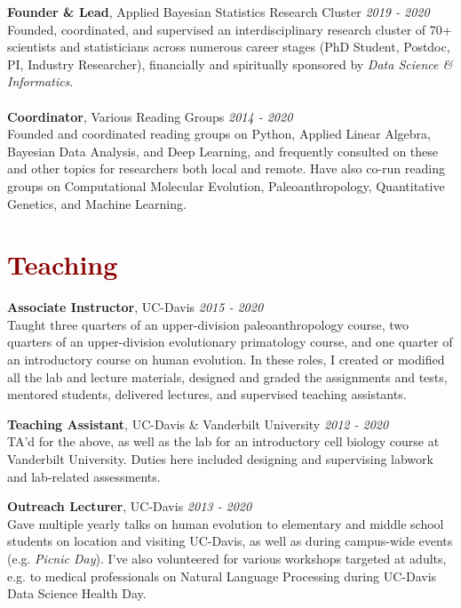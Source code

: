\documentclass[11pt,margin,line]{resume}
\begin{document}
\begin{resume}
\textbf{Founder \& Lead}, Applied Bayesian Statistics Research Cluster \hfill \emph{2019 - 2020}\\
Founded, coordinated, and supervised an interdisciplinary research cluster of 70+ scientists and statisticians across numerous career stages (PhD Student, Postdoc, PI, Industry Researcher), financially and spiritually sponsored by \emph{Data Science \& Informatics}.\vspace{-1.5mm}\\\\
\textbf{Coordinator}, Various Reading Groups \hfill \emph{2014 - 2020}\\
Founded and coordinated reading groups on Python, Applied Linear Algebra, Bayesian Data Analysis, and Deep Learning, and frequently consulted on these and other topics for researchers both local and remote. Have also co-run reading groups on Computational Molecular Evolution, Paleoanthropology, Quantitative Genetics, and Machine Learning.
\vspace{-1.5mm}

\section{\large\textcolor{DarkRed}{Teaching}}

\textbf{Associate Instructor}, UC-Davis \hfill \emph{2015  - 2020}\\
Taught three quarters of an upper-division paleoanthropology course, two quarters of an upper-division evolutionary primatology course, and one quarter of an introductory course on human evolution. In these roles, I created or modified all the lab and lecture materials, designed and graded the assignments and tests, mentored students, delivered lectures, and supervised teaching assistants.
\vspace{-1.5mm}

\textbf{Teaching Assistant}, UC-Davis \& Vanderbilt University \hfill \emph{2012  - 2020}\\
TA'd for the above, as well as the lab for an introductory cell biology course at Vanderbilt University. Duties here included designing and supervising labwork and lab-related assessments.
\vspace{-1.5mm}

\textbf{Outreach Lecturer}, UC-Davis \hfill \emph{2013  - 2020}\\
Gave multiple yearly talks on human evolution to elementary and middle school students on location and visiting UC-Davis, as well as during campus-wide events (e.g. \emph{Picnic Day}). I've also volunteered for various workshops targeted at adults, e.g. to medical professionals on Natural Language Processing during UC-Davis Data Science Health Day.
\vspace{-1.5mm}


\end{resume}
\end{document}

